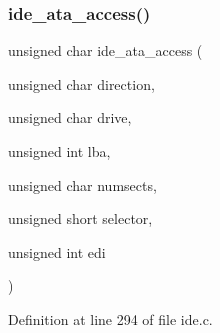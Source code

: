 \subsubsection{\texorpdfstring{ide\+\_\+ata\+\_\+access()}{ide\_ata\_access()}}
{\footnotesize\ttfamily unsigned char ide\+\_\+ata\+\_\+access (\begin{DoxyParamCaption}\item[{unsigned char}]{direction,  }\item[{unsigned char}]{drive,  }\item[{unsigned int}]{lba,  }\item[{unsigned char}]{numsects,  }\item[{unsigned short}]{selector,  }\item[{unsigned int}]{edi }\end{DoxyParamCaption})}



Definition at line 294 of file ide.\+c.


